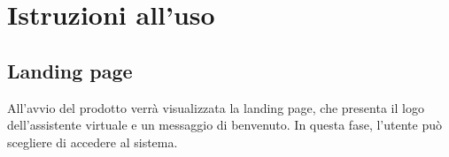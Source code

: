 \section{Istruzioni all'uso}

\subsection{Landing page}
All'avvio del prodotto verrà visualizzata la landing page, che presenta il logo dell'assistente virtuale e un messaggio di benvenuto. In questa fase, l'utente può scegliere di accedere al sistema.
\begin{center}
\end{center}
